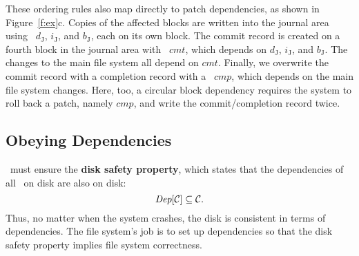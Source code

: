 \def\PXcmt{\textit{cmt}}
\def\PXcmp{\textit{cmp}}

These ordering rules also map directly to patch dependencies, as shown in
 Figure~\ref{f:ex}c.
%
Copies of the affected blocks are written into the journal area using
 \patches\ $d_\textrm{J}$, $i_\textrm{J}$, and $b_\textrm{J}$, each on its
 own block.
%
The commit record is created on a fourth block in the journal area with
\patch\ $\PXcmt$, which depends on $d_\textrm{J}$,
$i_\textrm{J}$, and $b_\textrm{J}$.
%
The changes to the main file system all depend on $\PXcmt$.
%
Finally, we overwrite the commit record with a completion record with a
\patch\ $\PXcmp$, which depends on the main file system changes.
%
Here, too, a circular block dependency requires the system to roll back a
 patch, namely $\PXcmp$, and write the commit/completion record twice.

\begin{comment}
This arrangement of dependencies ensures that the commit record is not written
to disk until all the journal data is present there, that the updates to the
file system itself are not written until the commit record is present on disk,
and that the completion record is not written until the entire transaction is
complete.

This example also contains an instance of a \patch\ which will need to be
reverted: $cmp$, which overwrites the commit record written by $cmt$ (and
thus $\PBlock{cmp} = \PBlock{cmt}$), cannot be written with $cmt$ since
$cmp \PDDepend \{b$, $i$, $i'$, $d\} \PDDepend cmt$.
%
So, we must revert $cmp$ and write $\PBlock{cmp}$ with only $cmt$ applied,
then write $b$, $i$, $i'$, and $d$, and finally write $\PBlock{cmp}$
again in order to write $cmp$.
\end{comment}


\subsection{Obeying Dependencies}
\label{sec:patch:dependencies}

\Kudos\ must ensure the \textbf{disk safety property}, which states that
 the dependencies of all \patches\ on disk are also on disk:
%
\[ \PDepset{\PDisk} \subseteq \PDisk. \]
%
Thus, no matter when the system crashes, the disk is consistent in terms of
dependencies.
%
The file system's job is to set up dependencies so that the disk safety
property implies file system correctness.

\begin{comment}
 However, \Kudos\ can only control when \patches\ are handed to the disk
 controller, not when they are written to disk.
 Disk controller behavior is encapsulated in the following atomic action:

 \begin{tabbing}
 \textit{Commit block:} \\
 \quad Pick some block $b$ with $\PInf[b] \neq \emptyset$. \\
 \quad Move each $p \in \PInf[b]$ to $\PDisk$ (committed).
 \end{tabbing}
\end{comment}

